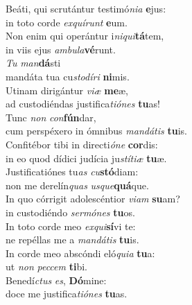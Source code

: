 \evenverse Beáti, qui scrutántur testimó\textit{ni}\textit{a} \textbf{e}jus:~\*\\
\evenverse in toto corde \textit{ex}\textit{quí}\textit{runt} \textbf{e}um.\\
\oddverse Non enim qui operántur i\textit{ni}\textit{qui}\textbf{tá}tem,~\*\\
\oddverse in viis ejus \textit{am}\textit{bu}\textit{la}\textbf{vé}runt.\\
\evenverse \textit{Tu} \textit{man}\textbf{dá}sti~\*\\
\evenverse mandáta tua cu\textit{sto}\textit{dí}\textit{ri} \textbf{ni}mis.\\
\oddverse Utinam dirigántur \textit{vi}\textit{æ} \textbf{me}æ,~\*\\
\oddverse ad custodiéndas justifica\textit{ti}\textit{ó}\textit{nes} \textbf{tu}as!\\
\evenverse Tunc \textit{non} \textit{con}\textbf{fún}dar,~\*\\
\evenverse cum perspéxero in ómnibus \textit{man}\textit{dá}\textit{tis} \textbf{tu}is.\\
\oddverse Confitébor tibi in directi\textit{ó}\textit{ne} \textbf{cor}dis:~\*\\
\oddverse in eo quod dídici judícia ju\textit{stí}\textit{ti}\textit{æ} \textbf{tu}æ.\\
\evenverse Justificatiónes tu\textit{as} \textit{cu}\textbf{stó}diam:~\*\\
\evenverse non me derelín\textit{quas} \textit{us}\textit{que}\textbf{quá}que.\\
\oddverse In quo córrigit adolescéntior \textit{vi}\textit{am} \textbf{su}am?~\*\\
\oddverse in custodiéndo \textit{ser}\textit{mó}\textit{nes} \textbf{tu}os.\\
\evenverse In toto corde meo \textit{ex}\textit{qui}\textbf{sí}vi te:~\*\\
\evenverse ne repéllas me a \textit{man}\textit{dá}\textit{tis} \textbf{tu}is.\\
\oddverse In corde meo abscóndi eló\textit{qui}\textit{a} \textbf{tu}a:~\*\\
\oddverse ut \textit{non} \textit{pec}\textit{cem} \textbf{ti}bi.\\
\evenverse Benedí\textit{ctus} \textit{es}, \textbf{Dó}mine:~\*\\
\evenverse doce me justifica\textit{ti}\textit{ó}\textit{nes} \textbf{tu}as.\\
